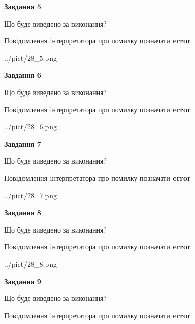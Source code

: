 \documentclass[11pt, ukrainian]{article}
\begin{document}
{\begin {large}
{\begin {center}\textbf{Завдання 5}\end {center}}\par
Що буде виведено за виконання? \par
Повідомлення інтерпретатора про помилку позначати \textbf{error}

\begin{center}
	{../pict/28_5.png}
\end{center}
\newpage

{\begin {center}\textbf{Завдання 6}\end {center}}\par
Що буде виведено за виконання? \par
Повідомлення інтерпретатора про помилку позначати \textbf{error}

\begin{center}
	{../pict/28_6.png}
\end{center}
\newpage

{\begin {center}\textbf{Завдання 7}\end {center}}\par
Що буде виведено за виконання? \par
Повідомлення інтерпретатора про помилку позначати \textbf{error}

\begin{center}
	{../pict/28_7.png}
\end{center}
\newpage

{\begin {center}\textbf{Завдання 8}\end {center}}\par
Що буде виведено за виконання? \par
Повідомлення інтерпретатора про помилку позначати \textbf{error}

\begin{center}
	{../pict/28_8.png}
\end{center}
\newpage

{\begin {center}\textbf{Завдання 9}\end {center}}\par
Що буде виведено за виконання? \par
Повідомлення інтерпретатора про помилку позначати \textbf{error}


\end{large}}
\end{document}
